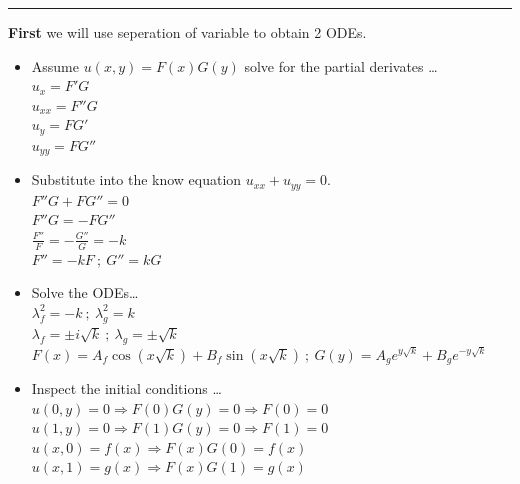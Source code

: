 \documentclass[10pt]{article}
\begin{document}
\hrule 

\vspace{7.5mm}

\noindent
\textbf{First} we will use seperation of variable to obtain 2 ODEs. \\

\begin{itemize}
    \item Assume $ \displaystyle u(x,y) = F(x)G(y) $ solve for the partial derivates \dots \\
    \subitem $ \displaystyle u_{x} = F'G $ \\
    \subitem $ \displaystyle u_{xx} = F''G $ \\   
    \subitem $ \displaystyle u_{y} = FG' $ \\
    \subitem $ \displaystyle u_{yy} = FG'' $ \\
    \item Substitute into the know equation $ \displaystyle u_{xx} + u_{yy} = 0 $. \\
    \subitem $ \displaystyle F''G + FG'' = 0 $ \\
    \subitem $ \displaystyle F''G = - FG''$ \\ 
    \subitem $ \displaystyle \frac{F''}{F} =  - \frac{G''}{G} = -k $ \\
    \subitem $ \displaystyle F'' = -kF \ ; \ G'' = kG $ \\
    \item Solve the ODEs\dots \\
    \subitem $ \displaystyle \lambda_{f}^2 = -k \ ; \ \lambda_{g}^2 = k $ \\
    \subitem $ \displaystyle \lambda_{f} = \pm i \sqrt{k} \ ; \ \lambda_{g} = \pm \sqrt{k} $ \\
    \subitem $ \displaystyle F(x) = A_{f}\cos{(x\sqrt{k})} + B_{f}\sin{(x\sqrt{k})} \ ; \ G(y) = A_{g}e^{y\sqrt{k}} + B_{g}e^{-y\sqrt{k}} $ \\
    \item Inspect the initial conditions \dots \\
    \subitem $ \displaystyle u(0,y) = 0 \Rightarrow F(0)G(y) = 0 \Rightarrow F(0) = 0 $ \\
    \subitem $ \displaystyle u(1,y) = 0 \Rightarrow F(1)G(y) = 0 \Rightarrow F(1) = 0 $ \\
    \subitem $ \displaystyle u(x,0) = f(x) \Rightarrow F(x)G(0) = f(x) $ \\
    \subitem $ \displaystyle u(x,1) = g(x) \Rightarrow F(x)G(1) = g(x) $ \\

\end{itemize}
\end{document}

